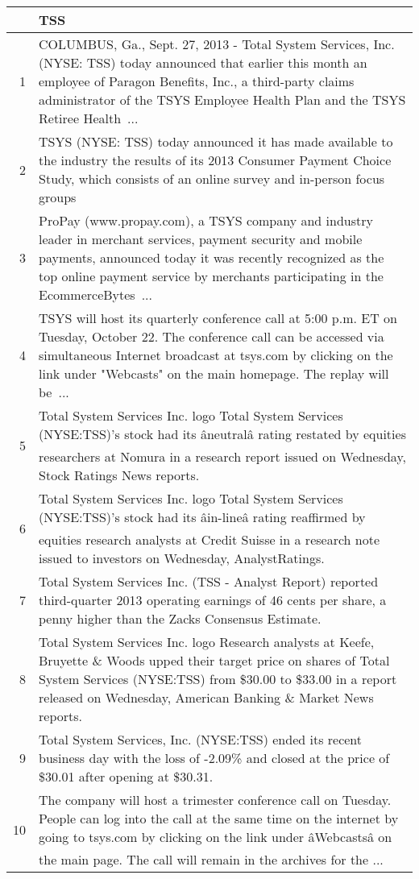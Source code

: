 \documentclass{tufte-handout}\usepackage[]{graphicx}\usepackage[]{color}
\begin{document}
\begin{tabularx}{\textwidth}{rX}
  \hline
 & TSS \\ 
  \hline
1 &  COLUMBUS, Ga., Sept. 27, 2013 - Total System Services, Inc. (NYSE: TSS) today announced that earlier this month an employee of Paragon Benefits, Inc., a third-party claims administrator of the TSYS Employee Health Plan and the TSYS Retiree Health ...  \\ 
  2 &  TSYS (NYSE: TSS) today announced it has made available to the industry the results of its 2013 Consumer Payment Choice Study, which consists of an online survey and in-person focus groups  \\ 
  3 &  ProPay (www.propay.com), a TSYS company and industry leader in merchant services, payment security and mobile payments, announced today it was recently recognized as the top online payment service by merchants participating in the EcommerceBytes ...  \\ 
  4 &  TSYS will host its quarterly conference call at 5:00 p.m. ET on Tuesday, October 22. The conference call can be accessed via simultaneous Internet broadcast at tsys.com by clicking on the link under "Webcasts" on the main homepage. The replay will be ...  \\ 
  5 &  Total System Services Inc. logo Total System Services (NYSE:TSS)'s stock had its âneutralâ rating restated by equities researchers at Nomura in a research report issued on Wednesday, Stock Ratings News reports.  \\ 
  6 &  Total System Services Inc. logo Total System Services (NYSE:TSS)'s stock had its âin-lineâ rating reaffirmed by equities research analysts at Credit Suisse in a research note issued to investors on Wednesday, AnalystRatings.  \\ 
  7 &  Total System Services Inc. (TSS - Analyst Report) reported third-quarter 2013 operating earnings of 46 cents per share, a penny higher than the Zacks Consensus Estimate.  \\ 
  8 &  Total System Services Inc. logo Research analysts at Keefe, Bruyette \& Woods upped their target price on shares of Total System Services (NYSE:TSS) from \$30.00 to \$33.00 in a report released on Wednesday, American Banking \& Market News reports.  \\ 
  9 &  Total System Services, Inc. (NYSE:TSS) ended its recent business day with the loss of -2.09\% and closed at the price of \$30.01 after opening at \$30.31.  \\ 
  10 &  The company will host a trimester conference call on Tuesday. People can log into the call at the same time on the internet by going to tsys.com by clicking on the link under âWebcastsâ on the main page. The call will remain in the archives for the ...  \\ 
   \hline
\end{tabularx}
\end{document}
